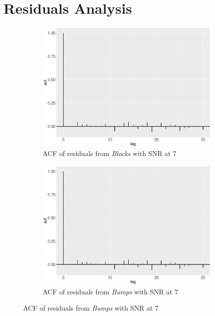 \clearpage

\section{Residuals Analysis}
\begin{figure}[!ht]
    \centering
    \begin{subfigure}{0.45\textwidth}
    \centering
    \includegraphics[width=\textwidth]{Chapters/02TractorSplineTheory/plot/ggplot/ggacfBlocks7.pdf}
    \caption{ACF of residuals from \textit{Blocks} with SNR at 7 }
    \end{subfigure}%
    \begin{subfigure}{0.45\textwidth}
    \centering
    \includegraphics[width=\textwidth]{Chapters/02TractorSplineTheory/plot/ggplot/ggacfBumps7.pdf}
    \caption{ACF of residuals from \textit{Bumps} with SNR at 7 }

\end{subfigure}
\end{figure}
